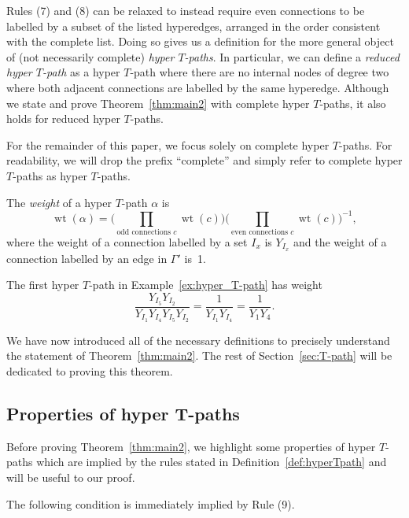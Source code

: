 \documentclass[pdftex]{sigma}
\numberwithin{equation}{section}
\DeclareMathOperator{\wt}{wt}
\begin{document}
\begin{Remark}
 Rules (7) and (8) can be relaxed to instead require even connections to be labelled by a subset of the listed hyperedges, arranged in the order consistent with the complete list. Doing so gives us a definition for the more general object of (not necessarily complete) \emph{hyper $T$-paths}. In particular, we can define a \emph{reduced hyper $T$-path} as a hyper $T$-path where there are no internal nodes of degree two where both adjacent connections are labelled by the same hyperedge. Although we state and prove Theorem~\ref{thm:main2} with complete hyper $T$-paths, it also holds for reduced hyper $T$-paths.
\end{Remark}

For the remainder of this paper, we focus solely on complete hyper $T$-paths. For readability, we will drop the prefix ``complete'' and simply refer to complete hyper $T$-paths as hyper $T$-paths.

\begin{Definition}
The \emph{weight} of a hyper $T$-path $\alpha$ is \[ \wt(\alpha)=\bigg(\prod_{\text{odd connections }c} \wt(c)\bigg)\bigg(\prod_{\text{even connections }c} \wt(c)\bigg)^{-1},\]
where the weight of a connection labelled by a set $I_x$ is $Y_{I_x}$ and the weight of a connection labelled by an edge in $\Gamma'$ is~1.
\end{Definition}

\begin{Example}
The first hyper $T$-path in Example~\ref{ex:hyper_T-path} has weight \[\frac{Y_{I_5}Y_{I_2}}{Y_{I_1}Y_{I_4}Y_{I_5}Y_{I_2}}=\frac{1}{Y_{I_1}Y_{I_4}}=\frac{1}{Y_1Y_4}.\]
\end{Example}

We have now introduced all of the necessary definitions to precisely understand the statement of Theorem~\ref{thm:main2}. The rest of Section~\ref{sec:T-path} will be dedicated to proving this theorem.

\subsection[Properties of hyper T-paths]{Properties of hyper $\boldsymbol{T}$-paths}\label{sec:T-path-lems}
Before proving Theorem~\ref{thm:main2}, we highlight some properties of hyper $T$-paths which are implied by the rules stated in Definition~\ref{def:hyperTpath} and will be useful to our proof.

The following condition is immediately implied by Rule (9).
\end{document}
